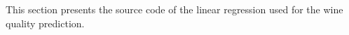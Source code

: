 This section presents the source code of the linear regression used for the wine quality prediction.


